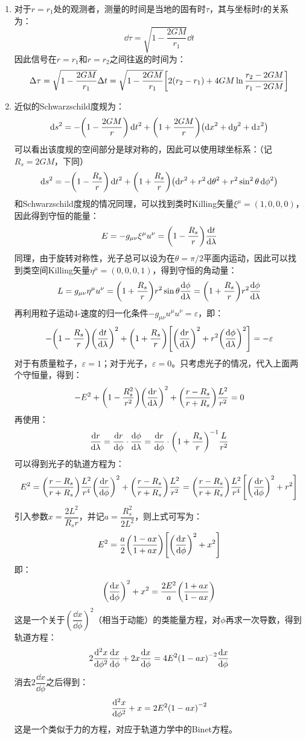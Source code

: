 \documentclass[a4paper]{article}
\begin{document}
\begin{enumerate}
    \item[7.(c)]
    对于$r = r_1$处的观测者，测量的时间是当地的固有时$\tau$，其与坐标时$t$的关系为：
    \[
        \dd{\tau} = \sqrt{1 - \frac{2GM}{r_1}} \dd{t}
    \]
    因此信号在$r = r_1$和$r = r_2$之间往返的时间为：
    \[
        \Delta \tau = \sqrt{1 - \frac{2GM}{r_1}} \Delta t = \sqrt{1 - \frac{2GM}{r_1}} \qty[2(r_2 - r_1) + 4GM \ln\frac{r_2 - 2GM}{r_1 - 2GM}]
    \]

    \item[15.(a)]
    近似的Schwarzschild度规为：
    \[
        \dd{s}^2 = -\qty(1 - \frac{2GM}{r}) \dd{t}^2 + \qty(1 + \frac{2GM}{r}) \qty(\dd{x}^2 + \dd{y}^2 + \dd{z}^2)
    \]
    可以看出该度规的空间部分是球对称的，因此可以使用球坐标系：（记$R_s = 2GM$，下同）
    \[
        \dd{s}^2 = -\qty(1 - \frac{R_s}{r}) \dd{t}^2 + \qty(1 + \frac{R_s}{r}) \qty(\dd{r}^2 + r^2 \dd{\theta}^2 + r^2 \sin^2\theta \dd{\phi}^2)
    \]
    和Schwarzschild度规的情况同理，可以找到类时Killing矢量$\xi^\mu = (1,0,0,0)$，因此得到守恒的能量：
    \[
        E = -g_{\mu\nu} \xi^\mu u^\nu = \qty(1 - \frac{R_s}{r}) \dv{t}{\lambda}
    \]
    同理，由于旋转对称性，光子总可以设为在$\theta = \pi/2$平面内运动，因此可以找到类空间Killing矢量$\eta^\mu = (0,0,0,1)$，得到守恒的角动量：
    \[
        L = g_{\mu\nu} \eta^\mu u^\nu = \qty(1 + \frac{R_s}{r}) r^2 \sin{\theta} \dv{\phi}{\lambda} = \qty(1 + \frac{R_s}{r}) r^2 \dv{\phi}{\lambda}
    \]
    再利用粒子运动4-速度的归一化条件$-g_{\mu\nu} u^\mu u^\nu = \varepsilon$，即：
    \[
        -\qty(1 - \frac{R_s}{r}) \qty(\dv{t}{\lambda})^2 + \qty(1 + \frac{R_s}{r}) \qty[\qty(\dv{r}{\lambda})^2 + r^2 \qty(\dv{\phi}{\lambda})^2] = -\varepsilon
    \]
    对于有质量粒子，$\varepsilon = 1$；对于光子，$\varepsilon = 0$。只考虑光子的情况，代入上面两个守恒量，得到：
    \[
        -E^2 + \qty(1 - \frac{R_s^2}{r^2}) \qty(\dv{r}{\lambda})^2 + \qty(\frac{r - R_s}{r + R_s}) \frac{L^2}{r^2} = 0
    \]
    再使用：
    \[
        \dv{r}{\lambda} = \dv{r}{\phi} \cdot \dv{\phi}{\lambda} = \dv{r}{\phi} \cdot \qty(1 + \frac{R_s}{r})^{-1} \frac{L}{r^2}
    \]
    可以得到光子的轨道方程为：
    \[
        E^2 = \qty(\frac{r - R_s}{r + R_s}) \frac{L^2}{r^4} \qty(\dv{r}{\phi})^2 + \qty(\frac{r - R_s}{r + R_s}) \frac{L^2}{r^2} = \qty(\frac{r - R_s}{r + R_s}) \frac{L^2}{r^4} \qty[\qty(\dv{r}{\phi})^2 + r^2]
    \]
    引入参数$x = \dfrac{2L^2}{R_s r}$，并记$a = \dfrac{R_s^2}{2L^2}$，则上式可写为：
    \[
        E^2 = \frac{a}{2} \qty(\frac{1 - ax}{1 + ax}) \qty[\qty(\dv{x}{\phi})^2 + x^2]
    \]
    即：
    \[
        \qty(\dv{x}{\phi})^2 + x^2 = \frac{2E^2}{a} \qty(\frac{1 + ax}{1 - ax})
    \]
    这是一个关于$\left(\dfrac{\dd{x}}{\dd{\phi}}\right)^2$（相当于动能）的类能量方程，对$\phi$再求一次导数，得到轨道方程：
    \[
        2 \dv[2]{x}{\phi} \dv{x}{\phi} + 2x \dv{x}{\phi} = 4E^2 \qty(1 - ax)^{-2} \dv{x}{\phi}
    \]
    消去$2\dfrac{\dd{x}}{\dd{\phi}}$之后得到：
    \[
        \dv[2]{x}{\phi} + x = 2E^2 \qty(1 - ax)^{-2}
    \]
    这是一个类似于力的方程，对应于轨道力学中的Binet方程。


\end{enumerate}
\end{document}

